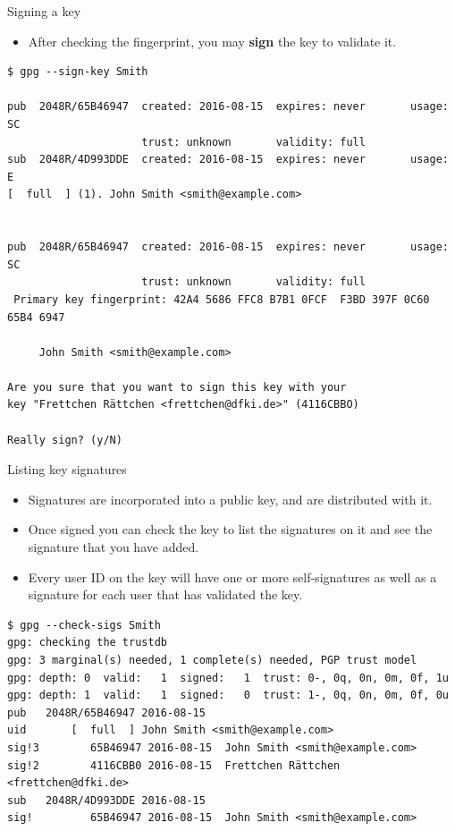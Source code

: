 \documentclass[
mode=present,
paper=smartboard,
size=20pt,
]{powerdot}
\newcommand\vsp{\vspace{-16mm}}
\begin{document}
\makeatletter\renewcommand{\verbatim@font}{\scriptsize\tt}\makeatother
\begin{slide}[method=direct]{Signing a key}
  \begin{itemize}
  \item After checking the fingerprint, you may \textbf{sign} the key
    to validate it.
  \end{itemize}
\vsp
\begin{verbatim}
$ gpg --sign-key Smith

pub  2048R/65B46947  created: 2016-08-15  expires: never       usage: SC  
                     trust: unknown       validity: full
sub  2048R/4D993DDE  created: 2016-08-15  expires: never       usage: E   
[  full  ] (1). John Smith <smith@example.com>


pub  2048R/65B46947  created: 2016-08-15  expires: never       usage: SC  
                     trust: unknown       validity: full
 Primary key fingerprint: 42A4 5686 FFC8 B7B1 0FCF  F3BD 397F 0C60 65B4 6947

     John Smith <smith@example.com>

Are you sure that you want to sign this key with your
key "Frettchen Rättchen <frettchen@dfki.de>" (4116CBBO)

Really sign? (y/N)
\end{verbatim}
\end{slide}

\begin{slide}[method=direct]{Listing key signatures}
  \begin{itemize}
  \item Signatures are incorporated into a public key, and are
    distributed with it.
  \item Once signed you can check the key to list the signatures on it
    and see the signature that you have added.
  \item Every user ID on the key will have one or more self-signatures
    as well as a signature for each user that has validated the key.
  \end{itemize}
\vsp
\begin{verbatim}
$ gpg --check-sigs Smith
gpg: checking the trustdb
gpg: 3 marginal(s) needed, 1 complete(s) needed, PGP trust model
gpg: depth: 0  valid:   1  signed:   1  trust: 0-, 0q, 0n, 0m, 0f, 1u
gpg: depth: 1  valid:   1  signed:   0  trust: 1-, 0q, 0n, 0m, 0f, 0u
pub   2048R/65B46947 2016-08-15
uid       [  full  ] John Smith <smith@example.com>
sig!3        65B46947 2016-08-15  John Smith <smith@example.com>
sig!2        4116CBB0 2016-08-15  Frettchen Rättchen <frettchen@dfki.de>
sub   2048R/4D993DDE 2016-08-15
sig!         65B46947 2016-08-15  John Smith <smith@example.com>
\end{verbatim}
\end{slide}
\end{document}
